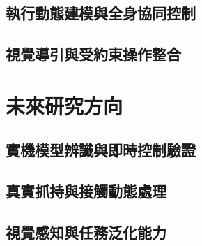 \subsection{執行動態建模與全身協同控制}
\subsection{視覺導引與受約束操作整合}

\section{未來研究方向}
\subsection{實機模型辨識與即時控制驗證}
\subsection{真實抓持與接觸動態處理}
\subsection{視覺感知與任務泛化能力}

